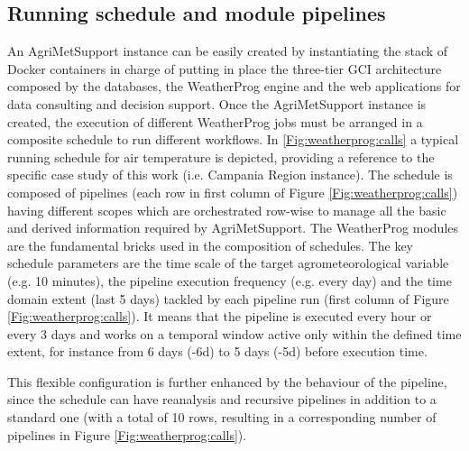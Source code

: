 \documentclass[authoryear,preprint,review,12pt]{elsarticle}
\begin{document}
\subsection{ Running schedule and module pipelines }
An AgriMetSupport instance can be easily created by instantiating the stack of Docker containers in charge of putting in place the three-tier GCI architecture composed by the databases, the WeatherProg engine and the web applications for data consulting and decision support.
Once the AgriMetSupport instance is created, the execution of different WeatherProg jobs must be arranged in a composite schedule to run %
different workflows.
In \cref{Fig:weatherprog:calls} a typical running schedule for air temperature is depicted, providing a reference to the specific case study of this work (i.e. Campania Region instance).
The schedule is composed of pipelines (each row in first column of Figure \ref{Fig:weatherprog:calls}) having different scopes which are orchestrated row-wise to manage all the basic and derived information required by AgriMetSupport.
The WeatherProg modules are the fundamental bricks used in the composition of schedules.
The key schedule parameters are the time scale of the target agrometeorological variable (e.g. 10 minutes), the pipeline execution frequency (e.g. every day) and the time domain extent (last 5 days) tackled by each pipeline run (first column of Figure \ref{Fig:weatherprog:calls}).
It means that the pipeline is executed every hour or every 3 days and works on a temporal window active only within the defined time extent, for instance from 6 days (-6d) to 5 days (-5d) before execution time.

This flexible configuration is further enhanced by the behaviour of the pipeline, since the schedule can have reanalysis and recursive pipelines in addition to a standard one (with a total of 10 rows, resulting in a corresponding number of pipelines in Figure \ref{Fig:weatherprog:calls}).
\end{document}
